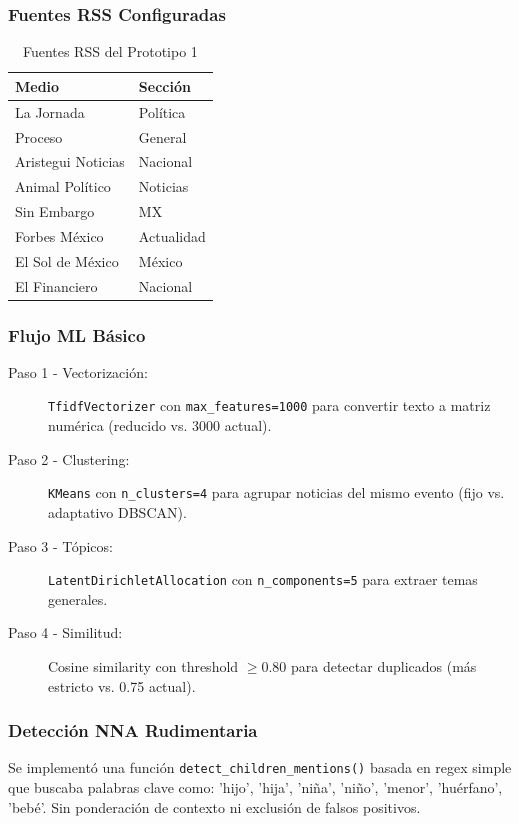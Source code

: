 \subsubsection{Fuentes RSS Configuradas}
\begin{table}[h]
\centering
\caption{Fuentes RSS del Prototipo 1}
\begin{tabular}{|l|l|}
\hline
\textbf{Medio} & \textbf{Sección} \\ \hline
La Jornada & Política \\
Proceso & General \\
Aristegui Noticias & Nacional \\
Animal Político & Noticias \\
Sin Embargo & MX \\
Forbes México & Actualidad \\
El Sol de México & México \\
El Financiero & Nacional \\ \hline
\end{tabular}
\end{table}

\subsubsection{Flujo ML Básico}
\begin{description}
    \item[Paso 1 - Vectorización:] \texttt{TfidfVectorizer} con \texttt{max\_features=1000} para convertir texto a matriz numérica (reducido vs. 3000 actual).
    \item[Paso 2 - Clustering:] \texttt{KMeans} con \texttt{n\_clusters=4} para agrupar noticias del mismo evento (fijo vs. adaptativo DBSCAN).
    \item[Paso 3 - Tópicos:] \texttt{LatentDirichletAllocation} con \texttt{n\_components=5} para extraer temas generales.
    \item[Paso 4 - Similitud:] Cosine similarity con threshold $\geq 0.80$ para detectar duplicados (más estricto vs. 0.75 actual).
\end{description}

\subsubsection{Detección NNA Rudimentaria}
Se implementó una función \texttt{detect\_children\_mentions()} basada en regex simple que buscaba palabras clave como: 'hijo', 'hija', 'niña', 'niño', 'menor', 'huérfano', 'bebé'. Sin ponderación de contexto ni exclusión de falsos positivos.

